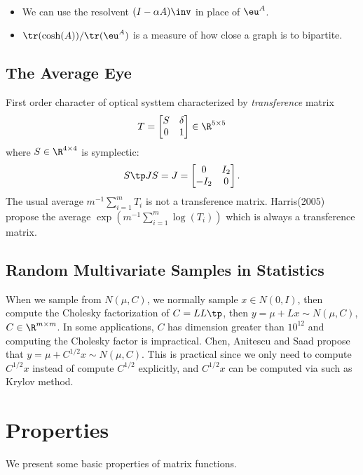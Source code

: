 \documentclass{article}
\begin{document}
\begin{remark}
    \
    \begin{itemize}
        \item We can use the resolvent $(I - \alpha A)\inv$ in place of
        $\eu^A$.
        \item $\tr(\cosh(A))/\tr(\eu^A)$ is a measure of how close a
        graph is to bipartite.
    \end{itemize}
\end{remark}

\subsection{The Average Eye}
First order character of optical systtem characterized by
\emph{transference} matrix 
\begin{equation}\notag
    T = \begin{bmatrix}
        S & \delta \\ 0  & 1
    \end{bmatrix}\in \R^{5\times 5}
\end{equation}
where $S \in \R^{4\times 4}$ is symplectic:
\begin{equation}\notag
    S\tp J S = J = \begin{bmatrix}
        0 & I_2 \\ -I_2 & 0
    \end{bmatrix}.
\end{equation}
The usual average $m^{-1}\sum_{i=1}^mT_i$ is not a transference matrix.
Harris(2005) propose the average $\exp(m^{-1}\sum_{i=1}^m\log(T_i))$
which is always a transference matrix. 

\subsection{Random Multivariate Samples in Statistics}
When we sample from $N(\mu,C)$, we normally sample $x\in N(0,I)$, then
compute the Cholesky factorization of $C = LL\tp$, then $y = \mu + Lx
\sim N(\mu,C)$, $C\in\R^{m\times m}$. In some applications, $C$ has
dimension greater than $10^{12}$ and computing the Cholesky factor is
impractical. Chen, Anitescu and Saad propose that $y = \mu + C^{1/2}x
\sim N(\mu,C)$. This is practical since we only need to compute
$C^{1/2}x$ instead of compute $C^{1/2}$ explicitly, and $C^{1/2}x$ can
be computed via such as Krylov method.




\section{Properties}
We present some basic properties of matrix functions.
\end{document}
